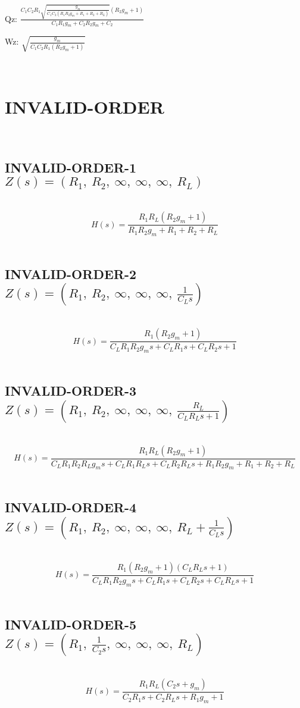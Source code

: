 \documentclass{article}
\begin{document}
Qz: $\frac{C_{1} C_{2} R_{1} \sqrt{\frac{g_{m}}{C_{1} C_{2} \left(R_{1} R_{2} g_{m} + R_{1} + R_{2} + R_{L}\right)}} \left(R_{2} g_{m} + 1\right)}{C_{1} R_{1} g_{m} + C_{2} R_{2} g_{m} + C_{2}}$\ 

Wz: $\sqrt{\frac{g_{m}}{C_{1} C_{2} R_{1} \left(R_{2} g_{m} + 1\right)}}$\ 

\ 

\section{INVALID-ORDER}\ 
\subsection{INVALID-ORDER-1 $Z(s) = \left( R_{1}, \  R_{2}, \  \infty, \  \infty, \  \infty, \  R_{L}\right)$ } \ 
\textbf{\[H(s) = \frac{R_{1} R_{L} \left(R_{2} g_{m} + 1\right)}{R_{1} R_{2} g_{m} + R_{1} + R_{2} + R_{L}}\] } \ 
\subsection{INVALID-ORDER-2 $Z(s) = \left( R_{1}, \  R_{2}, \  \infty, \  \infty, \  \infty, \  \frac{1}{C_{L} s}\right)$ } \ 
\textbf{\[H(s) = \frac{R_{1} \left(R_{2} g_{m} + 1\right)}{C_{L} R_{1} R_{2} g_{m} s + C_{L} R_{1} s + C_{L} R_{2} s + 1}\] } \ 
\subsection{INVALID-ORDER-3 $Z(s) = \left( R_{1}, \  R_{2}, \  \infty, \  \infty, \  \infty, \  \frac{R_{L}}{C_{L} R_{L} s + 1}\right)$ } \ 
\textbf{\[H(s) = \frac{R_{1} R_{L} \left(R_{2} g_{m} + 1\right)}{C_{L} R_{1} R_{2} R_{L} g_{m} s + C_{L} R_{1} R_{L} s + C_{L} R_{2} R_{L} s + R_{1} R_{2} g_{m} + R_{1} + R_{2} + R_{L}}\] } \ 
\subsection{INVALID-ORDER-4 $Z(s) = \left( R_{1}, \  R_{2}, \  \infty, \  \infty, \  \infty, \  R_{L} + \frac{1}{C_{L} s}\right)$ } \ 
\textbf{\[H(s) = \frac{R_{1} \left(R_{2} g_{m} + 1\right) \left(C_{L} R_{L} s + 1\right)}{C_{L} R_{1} R_{2} g_{m} s + C_{L} R_{1} s + C_{L} R_{2} s + C_{L} R_{L} s + 1}\] } \ 
\subsection{INVALID-ORDER-5 $Z(s) = \left( R_{1}, \  \frac{1}{C_{2} s}, \  \infty, \  \infty, \  \infty, \  R_{L}\right)$ } \ 
\textbf{\[H(s) = \frac{R_{1} R_{L} \left(C_{2} s + g_{m}\right)}{C_{2} R_{1} s + C_{2} R_{L} s + R_{1} g_{m} + 1}\] } \ 
\end{document}
